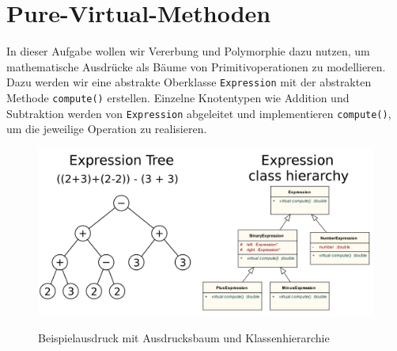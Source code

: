\section{\ExercisePrefixObjectOrientation Pure-Virtual-Methoden}
In dieser Aufgabe wollen wir Vererbung und Polymorphie dazu nutzen, um mathematische Ausdrücke als Bäume von Primitivoperationen zu modellieren.
Dazu werden wir eine abstrakte Oberklasse \lstinline{Expression} mit der abstrakten Methode \lstinline{compute()} erstellen.
Einzelne Knotentypen wie Addition und Subtraktion werden von \lstinline{Expression} abgeleitet und implementieren \lstinline{compute()}, um die jeweilige Operation zu realisieren.
\begin{figure}[h]
\begin{center}
	\includegraphics[width=.75\textwidth]{03_oo/figures/ExpressionTree.png}\\
	\caption{Beispielausdruck mit Ausdrucksbaum und Klassenhierarchie}
\end{center}
\end{figure}


